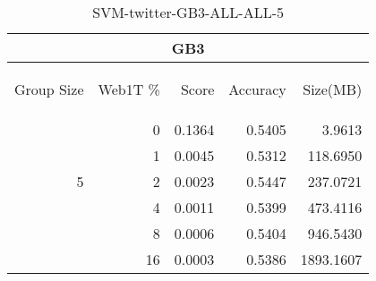 \begin{center}
\begin{table}[htbp] 
 \begin{center}
\begin{tabular}{ | r | r | r | r | r |}
\hline
\multicolumn{5}{|c|}{GB3}\\
\hline
\begin{sideways}Group Size\end{sideways} & \begin{sideways}Web1T \%\end{sideways} & \begin{sideways}Score\end{sideways} & \begin{sideways}Accuracy\end{sideways} & \begin{sideways}Size(MB)\end{sideways}\\
\hline
\multirow{5}{*}{5}
 & 0 & 0.1364 & 0.5405 & 3.9613\\ \cline{2-5}
 & 1 & 0.0045 & 0.5312 & 118.6950\\ \cline{2-5}
 & 2 & 0.0023 & 0.5447 & 237.0721\\ \cline{2-5}
 & 4 & 0.0011 & 0.5399 & 473.4116\\ \cline{2-5}
 & 8 & 0.0006 & 0.5404 & 946.5430\\ \cline{2-5}
 & 16 & 0.0003 & 0.5386 & 1893.1607\\ \cline{2-5}
\hline
\end{tabular}
\caption{SVM-twitter-GB3-ALL-ALL-5}
\label{table:SVM-twitter-GB3-ALL-ALL-5}
\end{center}
 \end{table}
\end{center}

